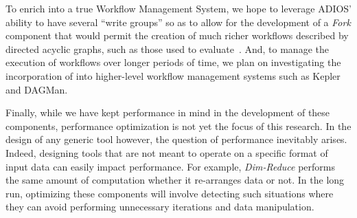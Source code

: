To enrich \sys into a true Workflow Management
System, we hope to leverage
ADIOS' ability to have several ``write groups''
so as to allow for the development
of a {\em Fork} component
that would permit
the creation of much richer workflows
described by directed acyclic graphs,
such as those used to evaluate~\cite{sim2015analyzethis}.
And, to manage the execution of workflows
over longer periods of time,
we plan on investigating
the incorporation of \sys into
higher-level workflow management systems
such as Kepler and DAGMan.

Finally, while we have kept performance in mind in the development of these
components, performance optimization is not yet the focus of this research. In
the design of any generic tool however, the question of performance inevitably
arises. Indeed, designing tools that are not meant to operate on a specific
format of input data can easily impact performance. For example, {\em
Dim-Reduce} performs the same amount of computation whether it re-arranges data
or not. In the long run, optimizing these components will involve detecting
such situations where they can avoid performing unnecessary iterations and data
manipulation.
\fi
